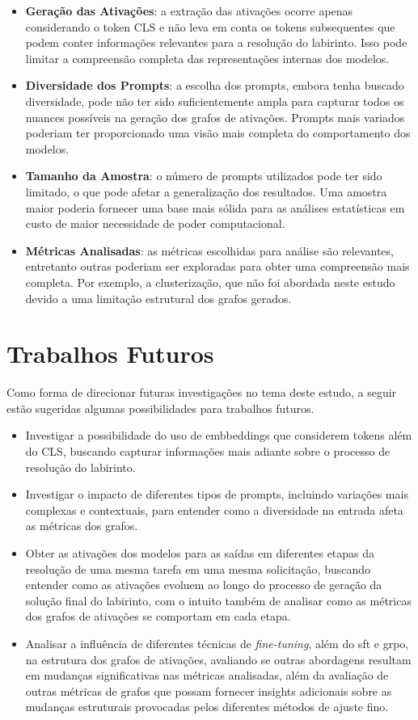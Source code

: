 \begin{itemize}
    \item \textbf{Geração das Ativações}: a extração das ativações ocorre apenas considerando o token CLS e não leva em conta os tokens subsequentes que podem conter informações relevantes para a resolução do labirinto. Isso pode limitar a compreensão completa das representações internas dos modelos.
    \item \textbf{Diversidade dos Prompts}: a escolha dos prompts, embora tenha buscado diversidade, pode não ter sido suficientemente ampla para capturar todos os nuances possíveis na geração dos grafos de ativações. Prompts mais variados poderiam ter proporcionado uma visão mais completa do comportamento dos modelos.
    \item \textbf{Tamanho da Amostra}: o número de prompts utilizados pode ter sido limitado, o que pode afetar a generalização dos resultados. Uma amostra maior poderia fornecer uma base mais sólida para as análises estatísticas em custo de maior necessidade de poder computacional.
    \item \textbf{Métricas Analisadas}: as métricas escolhidas para análise são relevantes, entretanto outras poderiam ser exploradas para obter uma compreensão mais completa. Por exemplo, a clusterização, que não foi abordada neste estudo devido a uma limitação estrutural dos grafos gerados.
\end{itemize}

\section{Trabalhos Futuros}

Como forma de direcionar futuras investigações no tema deste estudo, a seguir estão sugeridas algumas possibilidades para trabalhos futuros.

\begin{itemize}
    \item Investigar a possibilidade do uso de embbeddings que considerem tokens além do CLS, buscando capturar informações mais adiante sobre o processo de resolução do labirinto.
    \item Investigar o impacto de diferentes tipos de prompts, incluindo variações mais complexas e contextuais, para entender como a diversidade na entrada afeta as métricas dos grafos.
    \item Obter as ativações dos modelos para as saídas em diferentes etapas da resolução de uma mesma tarefa em uma mesma solicitação, buscando entender como as ativações evoluem ao longo do processo de geração da solução final do labirinto, com o intuito também de analisar como as métricas dos grafos de ativações se comportam em cada etapa.
    \item Analisar a influência de diferentes técnicas de \textit{fine-tuning}, além do \gls{sft} e \gls{grpo}, na estrutura dos grafos de ativações, avaliando se outras abordagens resultam em mudanças significativas nas métricas analisadas, além da avaliação de outras métricas de grafos que possam fornecer insights adicionais sobre as mudanças estruturais provocadas pelos diferentes métodos de ajuste fino.
\end{itemize}

